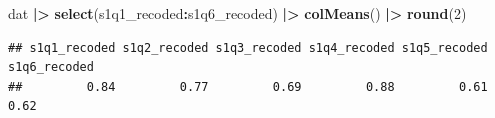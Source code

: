 \documentclass[
]{article}
\newenvironment{Shaded}{\begin{snugshade}}{\end{snugshade}}
\newcommand{\DecValTok}[1]{\textcolor[rgb]{0.00,0.00,0.81}{#1}}
\newcommand{\FunctionTok}[1]{\textcolor[rgb]{0.13,0.29,0.53}{\textbf{#1}}}
\newcommand{\NormalTok}[1]{#1}
\newcommand{\SpecialCharTok}[1]{\textcolor[rgb]{0.81,0.36,0.00}{\textbf{#1}}}
\begin{document}
\begin{Shaded}
\begin{Highlighting}[]
\NormalTok{dat }\SpecialCharTok{|\textgreater{}}
  \FunctionTok{select}\NormalTok{(s1q1\_recoded}\SpecialCharTok{:}\NormalTok{s1q6\_recoded) }\SpecialCharTok{|\textgreater{}}
  \FunctionTok{colMeans}\NormalTok{() }\SpecialCharTok{|\textgreater{}}
  \FunctionTok{round}\NormalTok{(}\DecValTok{2}\NormalTok{)}
\end{Highlighting}
\end{Shaded}

\begin{verbatim}
## s1q1_recoded s1q2_recoded s1q3_recoded s1q4_recoded s1q5_recoded s1q6_recoded 
##         0.84         0.77         0.69         0.88         0.61         0.62
\end{verbatim}
\end{document}
